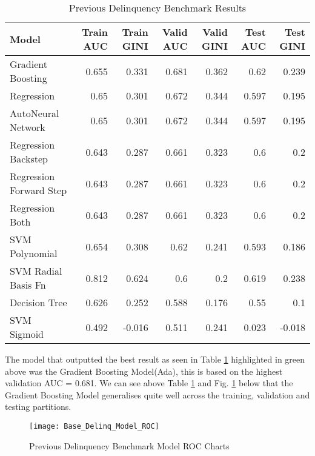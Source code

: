 \begin{table}[H]
	\centering
	\resizebox{\textwidth}{!}
	{
		\begin{tabular}{l | r | r| r |r| r|r}
			\hline
			\textbf{Model} & \textbf{Train AUC} & \textbf{Train GINI} & \textbf{Valid AUC} & \textbf{Valid GINI}& \textbf{Test AUC} & \textbf{Test GINI}\\
			\hline
			\cellcolor{green!25}Gradient Boosting & \cellcolor{green!25}0.655 & \cellcolor{green!25}0.331 & \cellcolor{green!25}0.681 & \cellcolor{green!25}0.362 & \cellcolor{green!25}0.62 & \cellcolor{green!25}0.239 \\
			Regression & 0.65 & 0.301 & 0.672 & 0.344 & 0.597 & 0.195 \\
			AutoNeural Network & 0.65 & 0.301 & 0.672 & 0.344 & 0.597 & 0.195 \\
			Regression Backstep & 0.643 & 0.287 & 0.661 & 0.323 & 0.6 & 0.2 \\
			Regression Forward Step & 0.643 & 0.287 & 0.661 & 0.323 & 0.6 & 0.2 \\
			Regression Both & 0.643 & 0.287 & 0.661 & 0.323 & 0.6 & 0.2 \\
			SVM Polynomial & 0.654 & 0.308 & 0.62 & 0.241 & 0.593 & 0.186 \\
			SVM Radial Basis Fn & 0.812 & 0.624 & 0.6 & 0.2 & 0.619 & 0.238 \\
			Decision Tree & 0.626 & 0.252 & 0.588 & 0.176 & 0.55 & 0.1 \\
			SVM Sigmoid & 0.492 & -0.016 & 0.511 & 0.241 & 0.023 & -0.018 \\
			\hline
		\end{tabular}
	}
	\caption{Previous Delinquency Benchmark Results}
	\label{table:prevdelinqbase}
\end{table}

The model that outputted the best result as seen in Table \ref{table:prevdelinqbase} highlighted in green above was the Gradient Boosting Model(Ada), this is based on the highest validation AUC = 0.681. We can see above Table \ref{table:prevdelinqbase} and Fig. \ref{fig:Delinq_Model_ROC} below that the Gradient Boosting Model generalises quite well across the training, validation and testing partitions.

\begin{figure}[H]
	\texttt{[image: Base\_Delinq\_Model\_ROC]}
	\caption{Previous Delinquency Benchmark Model ROC Charts}
	\label{fig:Delinq_Model_ROC}
\end{figure}

